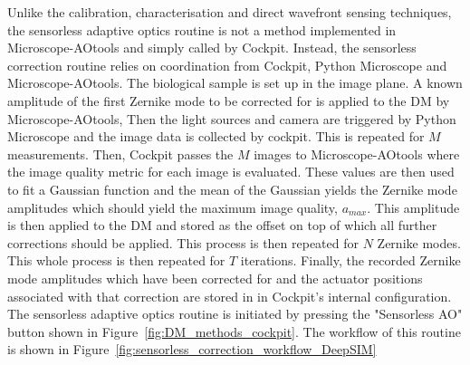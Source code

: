Unlike the calibration, characterisation and direct wavefront sensing techniques, the sensorless adaptive optics routine is not a method implemented in Microscope-AOtools and simply called by Cockpit. Instead, the sensorless correction routine relies on coordination from Cockpit, Python Microscope and Microscope-AOtools. The biological sample is set up in the image plane. A known amplitude of the first Zernike mode to be corrected for is applied to the DM by Microscope-AOtools, Then the light sources and camera are triggered by Python Microscope and the image data is collected by cockpit. This is repeated for $M$ measurements. Then, Cockpit passes the $M$ images to Microscope-AOtools where the image quality metric for each image is evaluated. These values are then used to fit a Gaussian function and the mean of the Gaussian yields the Zernike mode amplitudes which should yield the maximum image quality, $a_{max}$. This amplitude is then applied to the DM and stored as the offset on top of which all further corrections should be applied. This process is then repeated for $N$ Zernike modes. This whole process is then repeated for $T$ iterations. Finally, the recorded Zernike mode amplitudes which have been corrected for and the actuator positions associated with that correction are stored in in Cockpit's internal configuration. The sensorless adaptive optics routine is initiated by pressing the "Sensorless AO" button shown in Figure~\ref{fig:DM_methods_cockpit}. The workflow of this routine is shown in Figure~\ref{fig:sensorless_correction_workflow_DeepSIM}

